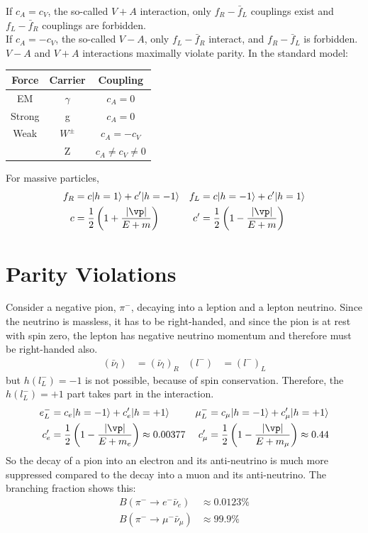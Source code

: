 \documentclass[a4paper, 11pt, normalem]{report}
\begin{document}
If $c_A=c_V$, the so-called $V+A$ interaction, only $f_R-\bar{f}_L$ couplings exist and $f_L-\bar{f}_R$ couplings are forbidden. \\
If $c_A=-c_V$, the so-called $V-A$, only $f_L-\bar{f}_R$ interact, and $f_R-\bar{f}_L$ is forbidden.\\
$V-A$ and $V+A$ interactions maximally violate parity.
In the standard model:
\begin{center}
    \begin{tabular}{c|c|c}
        Force & Carrier & Coupling \\
        \hline
        EM & $\gamma$ & $c_A=0$ \\
        Strong & g & $c_A=0$ \\
        Weak & $W^\pm$ & $c_A=-c_V$ \\
             & Z & $c_A\neq c_V\neq0$
    \end{tabular}
\end{center}
For massive particles, 
\begin{align}
    f_R &= c|h=1\rangle + c'|h=-1\rangle & f_L &= c|h=-1\rangle + c'|h=1\rangle \\
    c &= \frac12 \left(1+\frac{|\vp|}{E+m}\right) & c' &= \frac12 \left(1-\frac{|\vp|}{E+m}\right)
\end{align}

\section{Parity Violations}
Consider a negative pion, $\pi^-$, decaying into a leption and a lepton neutrino.
Since the neutrino is massless, it has to be right-handed, and since the pion is at rest with spin zero, the lepton has negative neutrino momentum and therefore must be right-handed also.
\begin{align}
    (\bar{\nu}_l) &= (\bar{\nu}_l)_R & (l^-) &= (l^-)_L
\end{align}
but $h(l^-_L) = -1$ is not possible, because of spin conservation.
Therefore, the $h(l^-_L)=+1$ part takes part in the interaction.
\begin{align}
    e^-_L &= c_e|h=-1\rangle + c_e'|h=+1\rangle & \mu_L^- &= c_\mu|h=-1\rangle + c_\mu'|h=+1\rangle \\
    c_e' &= \frac12 \left(1 - \frac{|\vp|}{E+m_e}\right) \approx 0.00377 & c_\mu' &= \frac12\left(1-\frac{|\vp|}{E+m_\mu}\right) \approx 0.44
\end{align}
So the decay of a pion into an electron and its anti-neutrino is much more suppressed compared to the decay into a muon and its anti-neutrino.
The branching fraction shows this:
\begin{align}
    B(\pi^-\to e^-\bar{\nu}_e) &\approx 0.0123\% \\
    B(\pi^-\to\mu^-\bar{\nu}_\mu) &\approx 99.9\%
\end{align}
\end{document}
